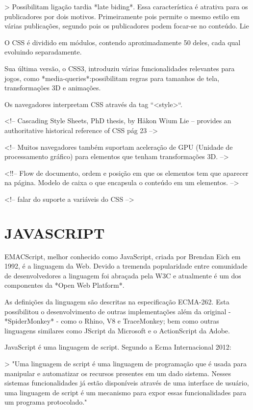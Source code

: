 \documentclass[11pt,a4paper]{article}
\begin{document}
>  Possibilitam ligação tardia *late biding*. Essa característica
é atrativa para os publicadores por dois motivos. Primeiramente pois
permite o mesmo estilo em várias publicações, segundo pois os
publicadores podem focar-se no conteúdo. Lie

O CSS é dividido em módulos, contendo aproximadamente 50 deles, cada
qual evoluindo separadamente.

Sua última versão, o CSS3, introduziu várias funcionalidades
relevantes para jogos, como *media-queries*:possibilitam regras para
tamanhos de tela, transformações 3D e animações.

Os navegadores interpretam CSS através da tag ``<style>``.

<!-- Cascading Style Sheets, PhD thesis, by Håkon Wium Lie – provides
an authoritative historical reference of CSS pág 23 -->

<!-- Muitos navegadores também suportam aceleração de GPU (Unidade de
processamento gráfico) para elementos que tenham transformações 3D.
-->

<!!-- Flow de documento, ordem e posição em que os elementos tem que
aparecer na página. Modelo de caixa o que encapsula o conteúdo em um
elementos. -->

<!-- falar do suporte a variáveis do CSS -->


\section{JAVASCRIPT}

EMACScript, melhor conhecido como JavaScript, criada por Brendan Eich
em 1992, é a linguagem da Web. Devido a tremenda popularidade entre
comunidade de desenvolvedores a linguagem foi abraçada pela W3C e
atualmente é um dos componentes da *Open Web Platform*.

As definições da linguagem são descritas na especificação ECMA-262.
Esta possibilitou o desenvolvimento de outras implementações além da
original - *SpiderMonkey* - como o Rhino, V8 e TraceMonkey; bem como
outras linguagens similares como JScript da Microsoft e o ActionScript
da Adobe.

JavaScript é uma linguagem de script. Segundo a Ecma Internacional
2012:

> "Uma linguagem de script é uma linguagem de programação que é
usada para manipular e automatizar os recursos presentes em um dado
sistema. Nesses sistemas funcionalidades já estão disponíveis
através de uma interface de usuário, uma linguagem de script é
um mecanismo para expor essas funcionalidades para um programa
protocolado."
\end{document}
